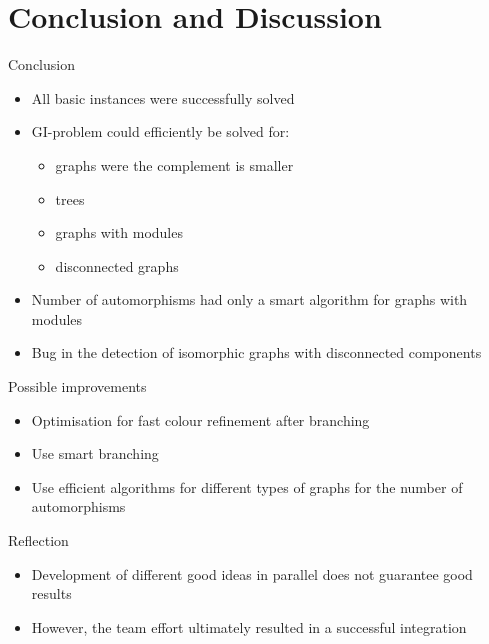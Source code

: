 \section*{Conclusion and Discussion}

\begin{frame}{Conclusion}
    \begin{itemize}
        \item All basic instances were successfully solved
        \item GI-problem could efficiently be solved for:
        \begin{itemize}
            \item graphs were the complement is smaller
            \item trees
            \item graphs with modules
            \item disconnected graphs
        \end{itemize}
        \item Number of automorphisms had only a smart algorithm for graphs with modules
        \item Bug in the detection of isomorphic graphs with disconnected components
    \end{itemize}
\end{frame}

\begin{frame}{Possible improvements}
  \begin{itemize}
    \item Optimisation for fast colour refinement after branching
    \item Use smart branching
    \item Use efficient algorithms for different types of graphs for the number of automorphisms
  \end{itemize}
\end{frame}

\begin{frame}{Reflection}
  \begin{itemize}
    \item Development of different good ideas in parallel does not guarantee good results
    \item However, the team effort ultimately resulted in a successful integration
  \end{itemize}
\end{frame}